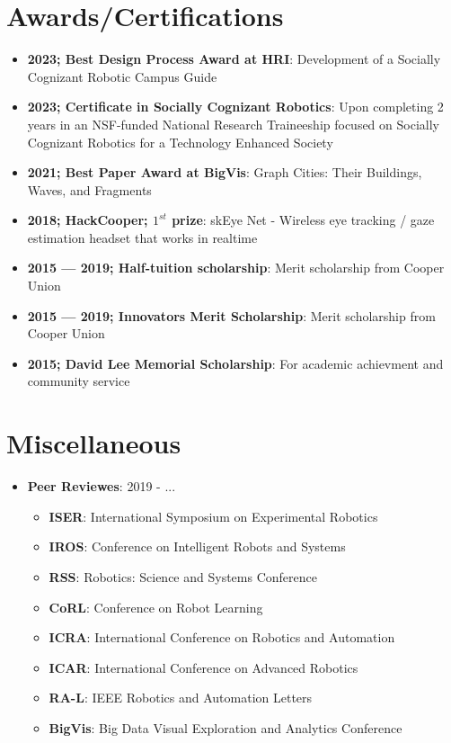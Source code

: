 \documentclass[letterpaper,11pt]{article}
\newcommand{\resumeItem}[2]{
\item\small{
		\textbf{#1}{: #2 \vspace{-2pt}}
	}
}
\newcommand{\resumeSubItem}[2]{\resumeItem{#1}{#2}\vspace{-4pt}}
\newcommand{\resumeSubHeadingListStart}{\begin{itemize}[leftmargin=*,label=]}
\newcommand{\resumeSubHeadingListEnd}{\end{itemize}}
\newcommand{\resumeItemListStart}{\begin{itemize}[label=$\bullet$]}
\newcommand{\resumeItemListEnd}{\end{itemize}\vspace{-5pt}}
\begin{document}
\section{Awards/Certifications}
\resumeSubHeadingListStart
\resumeSubItem{2023; Best Design Process Award at HRI}{Development of a Socially Cognizant Robotic Campus Guide}
\resumeSubItem{2023; Certificate in Socially Cognizant Robotics}{Upon completing 2 years in an NSF-funded National Research Traineeship focused on Socially Cognizant Robotics for a Technology Enhanced Society}
\resumeSubItem{2021; Best Paper Award at BigVis}{Graph Cities: Their Buildings, Waves, and Fragments}
\resumeSubItem{2018; HackCooper; $1^{st}$ prize}
{skEye Net - Wireless eye tracking / gaze estimation headset that works in realtime}
\resumeSubItem{2015 --- 2019; Half-tuition scholarship}{Merit scholarship from Cooper Union}
\resumeSubItem{2015 --- 2019; Innovators Merit Scholarship}{Merit scholarship from Cooper Union}
\resumeSubItem{2015; David Lee Memorial Scholarship}{For academic achievment and community service}
\resumeSubHeadingListEnd

\section{Miscellaneous}
\resumeSubHeadingListStart
\resumeSubItem{Peer Reviewes}{2019 - ...}
\resumeItemListStart
\resumeItem{ISER}{International Symposium on Experimental Robotics}
\resumeItem{IROS}{Conference on Intelligent Robots and Systems}
\resumeItem{RSS}{Robotics: Science and Systems Conference}
\resumeItem{CoRL}{Conference on Robot Learning}
\resumeItem{ICRA}{International Conference on Robotics and Automation}
\resumeItem{ICAR}{International Conference on Advanced Robotics}
\resumeItem{RA-L}{IEEE Robotics and Automation Letters}
\resumeItem{BigVis}{Big Data Visual Exploration and Analytics Conference}

\resumeItemListEnd
\resumeSubHeadingListEnd

\end{document}
